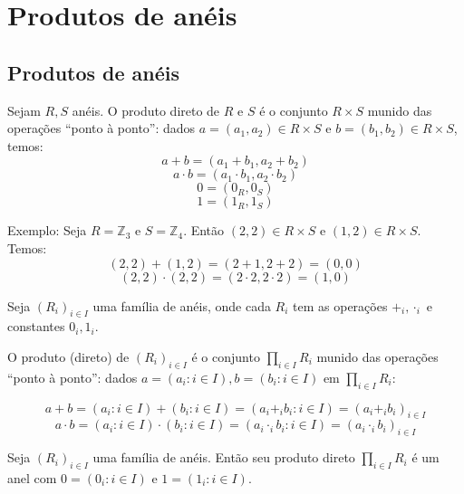 \chapter{Produtos de anéis}


\section{Produtos de anéis}

\begin{definition}
    Sejam $R, S$ anéis. O produto direto de $R$ e $S$ é o conjunto $R\times S$ munido das operações ``ponto à ponto'': dados $a=(a_1, a_2)\in R\times S$ e $b=(b_1, b_2)\in R\times S$, temos:
    $$a+b=(a_1+b_1, a_2+b_2)$$
    $$a\cdot b=(a_1\cdot b_1, a_2\cdot b_2)$$
    $$0=(0_R, 0_S)$$
    $$1=(1_R, 1_S)$$
\end{definition}

Exemplo: Seja $R=\mathbb Z_3$ e $S=\mathbb Z_4$. Então $(2, 2)\in R\times S$ e $(1, 2)\in R\times S$. Temos:
$$(2, 2)+(1, 2)=(2+ 1, 2+ 2)=(0, 0)$$
$$(2, 2)\cdot (2, 2)=(2\cdot 2, 2\cdot 2)=(1, 0)$$
\begin{definition}
    Seja $(R_i)_{i \in I}$ uma família de anéis, onde cada $R_i$ tem as operações $+_i, \cdot_i$ e constantes $0_i, 1_i$.
    
    O produto (direto) de $(R_i)_{i \in I}$ é o conjunto $\prod_{i \in I} R_i$ munido das operações ``ponto à ponto'': dados $a=(a_i: i \in I), b=(b_i: i \in I)$ em $\prod_{i \in I}R_i$:

    $$a+b=(a_i: i \in I)+(b_i: i \in I)=(a_i+_i b_i: i \in I)=(a_i+_ib_i)_{i \in I}$$
    $$a\cdot b=(a_i: i \in I)\cdot (b_i: i \in I)=(a_i\cdot _i b_i: i \in I)=(a_i\cdot _ib_i)_{i \in I}$$

\end{definition}

\begin{lemma}
    Seja $(R_i)_{i \in I}$ uma família de anéis. Então seu produto direto $\prod_{i \in I}R_i$ é um anel com $0=(0_i: i \in I)$ e $1=(1_i: i \in I)$.
\end{lemma}


